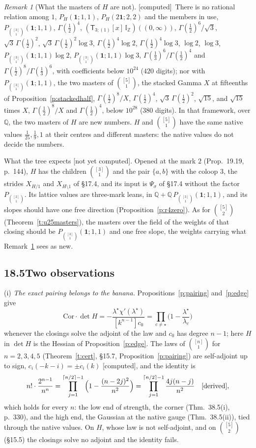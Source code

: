\documentclass[11pt]{article}
\newcommand{\one}{\mathbf 1}
\newcommand{\sT}{\mathsf T}
\newcommand{\IZ}{\mathbb I_{\mathbb Z}}
\newcommand{\Tx}[3]{(\sT_{#1;(1)}[x]\,#2)((#3,\infty))}
\newcommand{\Pth}{P_{\binom{[3]}1}(\one;1,1)}
\theoremstyle{plain}
\theoremstyle{definition}
\theoremstyle{remark}
\newtheorem{remark}[proposition]{Remark}
\newcommand{\derived}{\textup{[derived]}}
\newcommand{\computed}{\textup{[computed]}}
\newcommand{\notyet}{\textup{[not yet computed]}}
\begin{document}
\begin{remark}[What the masters of $H$ are not]\label{r:Hnot}\computed\
There is no rational relation among $1$, $P_H(\one;1,1)$, $P_H(2\one;2,2)$ and the members in use, $\Pth$, $\Gamma(\frac12)^4$, $\Tx{3}{\IZ}{0}$, $\Gamma(\frac12)^6/\sqrt3$, $\sqrt3\,\Gamma(\frac12)^2$, $\sqrt3\,\Gamma(\frac12)^2\log3$, $\Gamma(\frac12)^4\log2$, $\Gamma(\frac12)^4\log3$, $\log2$, $\log3$, $\Pth\log2$, $\Pth\log3$, $\Gamma(\frac13)^6/\Gamma(\frac12)^4$ and $\Gamma(\frac12)^8/\Gamma(\frac13)^6$, with coefficients below $10^{24}$ ($420$ digits); nor with $\Pth$, the two masters of $\binom{[5]}1$, the stacked Gamma $X$ at fifteenths of Proposition~\ref{p:stackedhalf}, $\Gamma(\frac12)^8/X$, $\Gamma(\frac12)^4$, $\sqrt3\,\Gamma(\frac12)^2$, $\sqrt{15}$, and $\sqrt{15}$ times $X$, $\Gamma(\frac12)^8/X$ and $\Gamma(\frac12)^4$, below $10^{28}$ ($380$ digits). In that framework, over $\mathbb Q$, the two masters of $H$ are new numbers. $H$ and $\binom{[5]}1$ have the same native values $\frac1{25},\frac19,1$ at their centres and different masters: the native values do not decide the numbers.
\end{remark}

\noindent What the tree expects \notyet. Opened at the mark $2$ (Prop.~19.19, p.~144), $H$ has the children $\binom{[3]}1$ and the pair $\{a,b\}$ with the coloop $3$, the strides $X_{H/1}$ and $X_{H\setminus1}$ of \S17.4, and its input is $\Psi_\sigma$ of \S17.4 without the factor $P_{\binom{[2]}1}$. Its lattice values are three-mark leans, in $\mathbb Q+\mathbb Q\,\Pth$, and its slopes should have one free direction (Proposition~\ref{p:r4zero}). As for $\binom{[5]}2$ (Theorem~\ref{t:u25masters}), the masters over the field of the weights of that closing should be $\Pth$ and one free slope, the weights carrying what Remark~\ref{r:Hnot} sees as new.

\subsection*{18.5\quad Two observations}

(i) \emph{The exact pairing belongs to the banana.} Propositions~\ref{p:pairing} and~\ref{p:edge} give
\[
\mathrm{Cor}\cdot\det H=-\frac{\lambda^\star\chi'(\lambda^\star)}{[k^{n-1}]c_0}=\prod_{c\ne\star}\Big(1-\frac{\lambda^\star}{\lambda_c}\Big)
\]
whenever the closings solve the adjoint of the law and $c_0$ has degree $n-1$; here $H$ in $\det H$ is the Hessian of Proposition~\ref{p:edge}. The laws of $\binom{[n]}1$ for $n=2,3,4,5$ (Theorem~\ref{t:cert}, \S15.7, Proposition~\ref{p:pairing}) are self-adjoint up to sign, $c_i(-k-i)=\pm c_i(k)$ \computed, and the identity is
\[
n!\cdot\frac{2^{n-1}}{n^n}=\prod_{j=1}^{\lceil n/2\rceil-1}\Big(1-\frac{(n-2j)^2}{n^2}\Big)=\prod_{j=1}^{\lceil n/2\rceil-1}\frac{4j(n-j)}{n^2}\quad\derived,
\]
which holds for every $n$: the low end of strength, the corner (Thm.~38.5(i), p.~330), and the high end, the Gaussian at the native gauge (Thm.~38.5(ii)), tied through the native values. On $H$, whose law is not self-adjoint, and on $\binom{[5]}2$ (\S15.5) the closings solve no adjoint and the identity fails.
\end{document}
